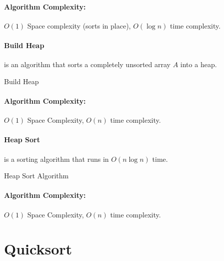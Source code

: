 \documentclass[a4paper,12pt]{report}
\DeclarePairedDelimiter{\floor}{\lfloor}{\rfloor}
\begin{document}
\paragraph{Algorithm Complexity: } $O(1)$ Space complexity (sorts in place), $O(\log n)$ time complexity.


\paragraph{Build Heap } is an algorithm that sorts a completely unsorted array $A$ into a heap. 

\begin{algorithm}[H]
\SetAlgoLined
{}
	\BlankLine
	\BlankLine
	
	\caption{Build Heap}
\end{algorithm}

\paragraph{Algorithm Complexity: } $O(1)$ Space Complexity, $O(n)$ time complexity.



\paragraph{Heap Sort } is a sorting algorithm that runs in $O(n\log n)$ time. 

\begin{algorithm}[H]
\SetAlgoLined
{}
	\BlankLine
	\BlankLine
	\caption{Heap Sort Algorithm}
\end{algorithm}

\paragraph{Algorithm Complexity: } $O(1)$ Space Complexity, $O(n)$ time complexity.



\section{Quicksort}
\end{document}
